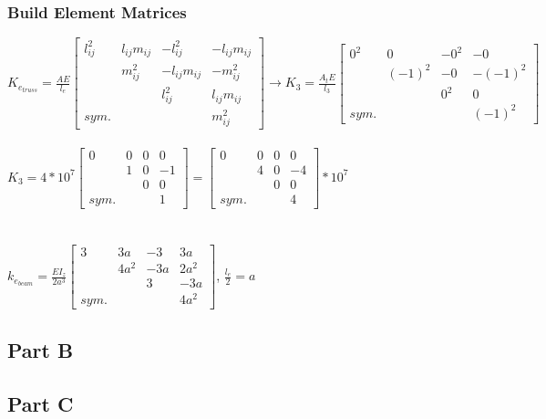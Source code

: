 \documentclass{article}
\begin{document}
\subsubsection*{Build Element Matrices}
$K_{e_{truss}}=\frac{AE}{l_e}
\begin{bmatrix}
    l_{ij}^2 & l_{ij}m_{ij} & -l_{ij}^2 & -l_{ij}m_{ij} \\
    & m_{ij}^2 & -l_{ij}m_{ij} & -m_{ij}^2 \\
    & & l_{ij}^2 & l_{ij}m_{ij} \\
    sym. & & & m_{ij}^2
\end{bmatrix}\rightarrow K_{3}=\frac{A_tE}{l_3}
\begin{bmatrix}
    0^2 & 0 & -0^2 & -0 \\
    & (-1)^2 & -0 & -(-1)^2 \\
    & & 0^2 & 0 \\
    sym. & & & (-1)^2
\end{bmatrix}$ \\\\
$K_3=4*10^7\begin{bmatrix}
    0 & 0 & 0 & 0 \\
    & 1 & 0 & -1 \\
    & & 0 & 0 \\
    sym. & & & 1
\end{bmatrix}=\begin{bmatrix}
    0 & 0 & 0 & 0 \\
    & 4 & 0 & -4 \\
    & & 0 & 0 \\
    sym. & & & 4
\end{bmatrix}*10^7$ \\\\\\
$k_{e_{beam}}=\frac{EI_z}{2a^3}\begin{bmatrix}
    3 & 3a & -3 & 3a \\
    & 4a^2 & -3a & 2a^2 \\
    & & 3 & -3a \\
    sym. & & & 4a^2
\end{bmatrix}$, \quad $\frac{l_e}{2}=a$

\subsection*{Part B}

\subsection*{Part C}
\end{document}
